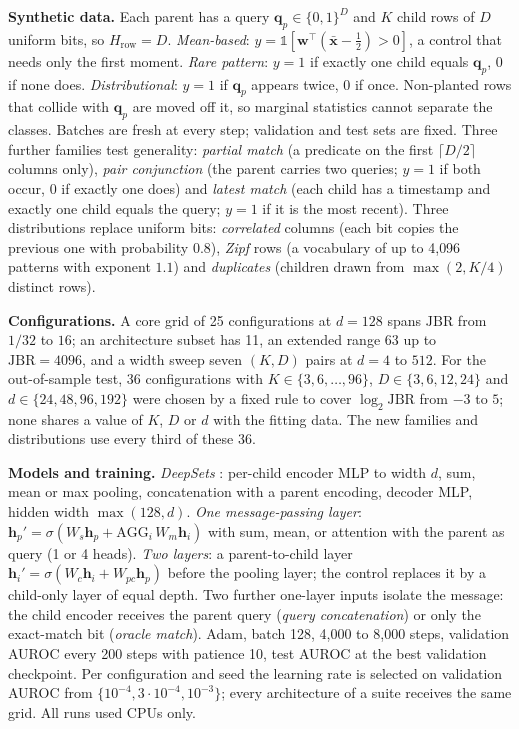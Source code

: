 \documentclass[conference]{IEEEtran}
\newcommand{\jbr}{\mathrm{JBR}}
\begin{document}
\textbf{Synthetic data.} Each parent has a query $\mathbf{q}_p \in \{0,1\}^D$ and $K$ child rows of $D$ uniform bits, so $H_{\mathrm{row}} = D$. \emph{Mean-based}: $y = \mathbb{1}[\mathbf{w}^\top(\bar{\mathbf{x}} - \tfrac12) > 0]$, a control that needs only the first moment. \emph{Rare pattern}: $y = 1$ if exactly one child equals $\mathbf{q}_p$, $0$ if none does. \emph{Distributional}: $y = 1$ if $\mathbf{q}_p$ appears twice, $0$ if once. Non-planted rows that collide with $\mathbf{q}_p$ are moved off it, so marginal statistics cannot separate the classes. Batches are fresh at every step; validation and test sets are fixed. Three further families test generality: \emph{partial match} (a predicate on the first $\lceil D/2\rceil$ columns only), \emph{pair conjunction} (the parent carries two queries; $y = 1$ if both occur, $0$ if exactly one does) and \emph{latest match} (each child has a timestamp and exactly one child equals the query; $y = 1$ if it is the most recent). Three distributions replace uniform bits: \emph{correlated} columns (each bit copies the previous one with probability $0.8$), \emph{Zipf} rows (a vocabulary of up to 4{,}096 patterns with exponent $1.1$) and \emph{duplicates} (children drawn from $\max(2, K/4)$ distinct rows).

\textbf{Configurations.} A core grid of 25 configurations at $d = 128$ spans $\jbr$ from $1/32$ to $16$; an architecture subset has 11, an extended range 63 up to $\jbr = 4096$, and a width sweep seven $(K,D)$ pairs at $d = 4$ to $512$. For the out-of-sample test, 36 configurations with $K \in \{3, 6, \dots, 96\}$, $D \in \{3, 6, 12, 24\}$ and $d \in \{24, 48, 96, 192\}$ were chosen by a fixed rule to cover $\log_2\jbr$ from $-3$ to $5$; none shares a value of $K$, $D$ or $d$ with the fitting data. The new families and distributions use every third of these 36.

\textbf{Models and training.} \emph{DeepSets} \cite{zaheer2017deepsets}: per-child encoder MLP to width $d$, sum, mean or max pooling, concatenation with a parent encoding, decoder MLP, hidden width $\max(128, d)$. \emph{One message-passing layer}: $\mathbf{h}_p' = \sigma(W_s \mathbf{h}_p + \mathrm{AGG}_i\, W_m \mathbf{h}_i)$ with sum, mean, or attention with the parent as query (1 or 4 heads). \emph{Two layers}: a parent-to-child layer $\mathbf{h}_i' = \sigma(W_c \mathbf{h}_i + W_{pc}\mathbf{h}_p)$ before the pooling layer; the control replaces it by a child-only layer of equal depth. Two further one-layer inputs isolate the message: the child encoder receives the parent query (\emph{query concatenation}) or only the exact-match bit (\emph{oracle match}). Adam, batch 128, 4{,}000 to 8{,}000 steps, validation AUROC every 200 steps with patience 10, test AUROC at the best validation checkpoint. Per configuration and seed the learning rate is selected on validation AUROC from $\{10^{-4}, 3\cdot10^{-4}, 10^{-3}\}$; every architecture of a suite receives the same grid. All runs used CPUs only.
\end{document}
